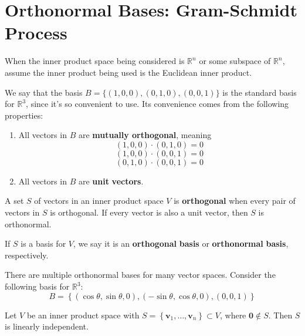 \section{Orthonormal Bases: Gram-Schmidt Process}
\begin{remark}
    When the inner product space being considered is \(\mathbb{R}^n\) or some subspace of \(\mathbb{R}^n\), assume the inner product being used is the Euclidean inner product.
\end{remark}
\noindent We say that the basis \(B=\{ (1,0,0),(0,1,0),(0,0,1) \} \) is the standard basis for \(\mathbb{R}^3\), since it's so convenient to use. Its convenience comes from the following properties:
\begin{enumerate}
    \item All vectors in \(B\) are \textbf{mutually orthogonal}, meaning
    \[
        (1,0,0)\cdot(0,1,0)=0
    \]
    \[
        (1,0,0)\cdot (0,0,1)=0
    \]
    \[
        (0,1,0)\cdot(0,0,1)=0
    \]
    \item All vectors in \(B\) are \textbf{unit} \textbf{vectors}.
\end{enumerate}
\begin{definition}
    A set \(S\) of vectors in an inner product space \(V\) is \textbf{orthogonal} when every pair of vectors in \(S\) is orthogonal. If every vector is also a unit vector, then \(S\) is orthonormal.
\end{definition}
If \(S\) is a basis for \(V\), we say it is an \textbf{orthogonal} \textbf{basis} or \textbf{orthonormal} \textbf{basis}, respectively. 
\begin{remark}
    There are multiple orthonormal bases for many vector spaces. Consider the following basis for \(\mathbb{R}^3\):
    \[
        B=\left\{ (\cos \theta ,\sin \theta ,0),(-\sin \theta ,\cos \theta ,0),(0,0,1) \right\}
    \]
\end{remark}
\begin{theorem}\label{orthobasis}
    Let \(V\) be an inner product space with \(S=\left\{ \mathbf{v}_1,\ldots,\mathbf{v}_n \right\} \subset V \), where \(\mathbf{0}\notin S\). Then \(S\) is linearly independent.
\end{theorem}
